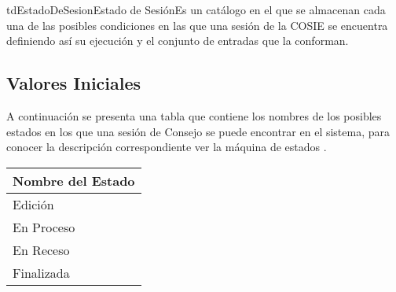 	\begin{TipoDeDato}{tdEstadoDeSesion}{Estado de Sesión}{Es un catálogo en el que se almacenan cada una de las posibles condiciones en las que una sesión de la COSIE se encuentra definiendo así su ejecución y el conjunto de entradas que la conforman.}
	
	\begin{tdAtributos}
	\end{tdAtributos}
	
	\subsection{Valores Iniciales}
	A continuación se presenta una tabla que contiene los nombres de los posibles estados en los que una sesión de Consejo se puede encontrar en el sistema, para conocer la descripción correspondiente ver la máquina de estados .\cdtEmpty
	
	\begin{longtable}{| p{}|}
	 			\rowcolor{colorPrincipal}
	 			\bf \color{white} Nombre del Estado\\
	 			\hline
	 				Edición \\
	 				\hline
	 				En Proceso\\
	 				\hline
	 				En Receso \\
	 				\hline
	 				Finalizada\\
	 			\hline
	 \end{longtable}
	\end{TipoDeDato}
	
